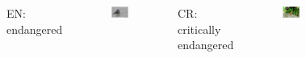 \begin{frame}
\begin{columns}
\begin{figure}
                \end{figure}
                EN: endangered
                \begin{figure}
                        \includegraphics[height=0.2\textheight]{Pics/EN}
                \end{figure}
                CR: critically endangered
                \begin{figure}
                        \includegraphics[height=0.2\textheight]{Pics/CR}
                \end{figure}
        \end{columns}

\end{frame}


